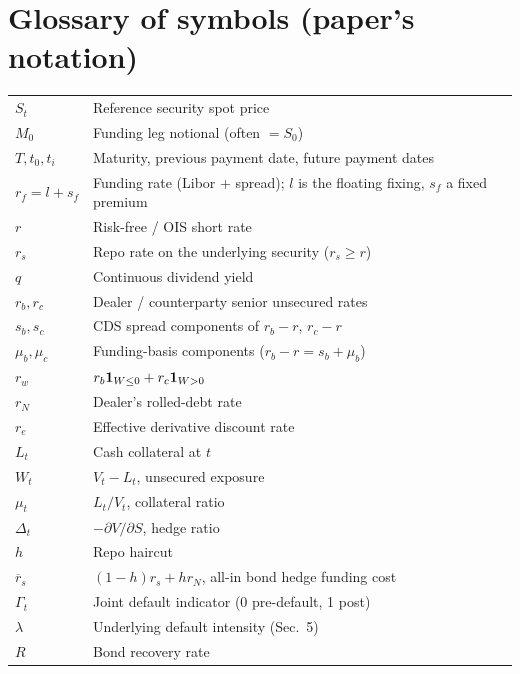 \documentclass[11pt,a4paper]{article}
\begin{document}
\section{Glossary of symbols (paper's notation)}
\begin{tabular}{@{}p{3cm}p{12cm}@{}}
\toprule
$S_t$             & Reference security spot price \\
$M_0$             & Funding leg notional (often $= S_0$) \\
$T, t_0, t_i$     & Maturity, previous payment date, future payment dates \\
$r_f = l + s_f$   & Funding rate (Libor + spread); $l$ is the floating fixing, $s_f$ a fixed premium \\
$r$               & Risk-free / OIS short rate \\
$r_s$             & Repo rate on the underlying security ($r_s \ge r$) \\
$q$               & Continuous dividend yield \\
$r_b, r_c$        & Dealer / counterparty senior unsecured rates \\
$s_b, s_c$        & CDS spread components of $r_b - r$, $r_c - r$ \\
$\mu_b, \mu_c$    & Funding-basis components ($r_b - r = s_b + \mu_b$) \\
$r_w$             & $r_b \mathbf{1}_{W \le 0} + r_c \mathbf{1}_{W > 0}$ \\
$r_N$             & Dealer's rolled-debt rate \\
$r_e$             & Effective derivative discount rate \\
$L_t$             & Cash collateral at $t$ \\
$W_t$             & $V_t - L_t$, unsecured exposure \\
$\mu_t$           & $L_t / V_t$, collateral ratio \\
$\Delta_t$        & $-\partial V / \partial S$, hedge ratio \\
$h$               & Repo haircut \\
$\overline r_s$   & $(1 - h) r_s + h r_N$, all-in bond hedge funding cost \\
$\Gamma_t$        & Joint default indicator (0 pre-default, 1 post) \\
$\lambda$         & Underlying default intensity (Sec.\ 5) \\
$R$               & Bond recovery rate \\

\end{tabular}
\end{document}

